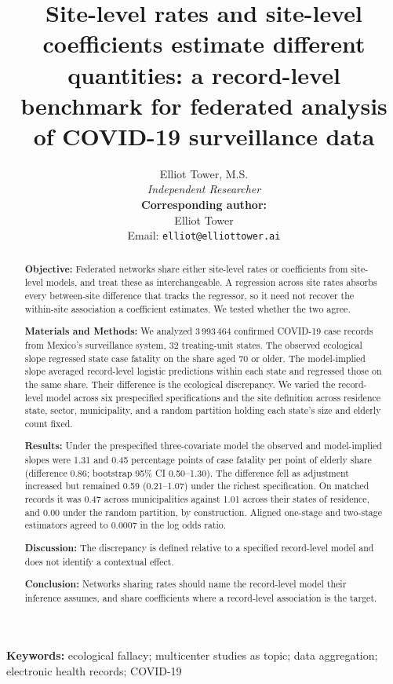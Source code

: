 \documentclass[11pt]{article}
\title{Site-level rates and site-level coefficients estimate different\\
quantities: a record-level benchmark for federated analysis\\
of COVID-19 surveillance data}
\author{Elliot Tower, M.S.\\
\textit{Independent Researcher}\\[6pt]
\textbf{Corresponding author:}\\
Elliot Tower\\
Email: \texttt{elliot@elliottower.ai}}
\date{}
\begin{document}
\maketitle

\begin{abstract}
\noindent\textbf{Objective:}
Federated networks share either site-level rates or coefficients from
site-level models, and treat these as interchangeable.  A regression
across site rates absorbs every between-site difference that tracks the
regressor, so it need not recover the within-site association a
coefficient estimates.  We tested whether the two agree.

\noindent\textbf{Materials and Methods:}
We analyzed 3\,993\,464 confirmed COVID-19 case records from Mexico's
surveillance system, 32 treating-unit states.  The observed
ecological slope regressed state case fatality on the share aged 70 or
older.  The model-implied slope averaged record-level logistic
predictions within each state and regressed those on the same share.
Their difference is the ecological discrepancy.  We varied the
record-level model across six prespecified specifications and the
site definition across residence state, sector, municipality, and a
random partition holding each state's size and elderly count fixed.

\noindent\textbf{Results:}
Under the prespecified three-covariate model the observed and
model-implied slopes were 1.31 and 0.45 percentage points of case
fatality per point of elderly share (difference 0.86; bootstrap 95\% CI
0.50--1.30).  The difference fell as adjustment increased but remained
0.59 (0.21--1.07) under the richest specification.  On matched records it
was 0.47 across municipalities against 1.01 across their states of
residence, and 0.00 under the random partition, by construction.  Aligned one-stage and two-stage estimators
agreed to 0.0007 in the log odds ratio.

\noindent\textbf{Discussion:}
The discrepancy is defined relative to a specified record-level model
and does not identify a contextual effect.

\noindent\textbf{Conclusion:}
Networks sharing rates should name the record-level model their inference
assumes, and share coefficients where a record-level
association is the target.
\end{abstract}

\noindent\textbf{Keywords:} ecological fallacy; multicenter studies as topic; data aggregation;
electronic health records; COVID-19
\end{document}

